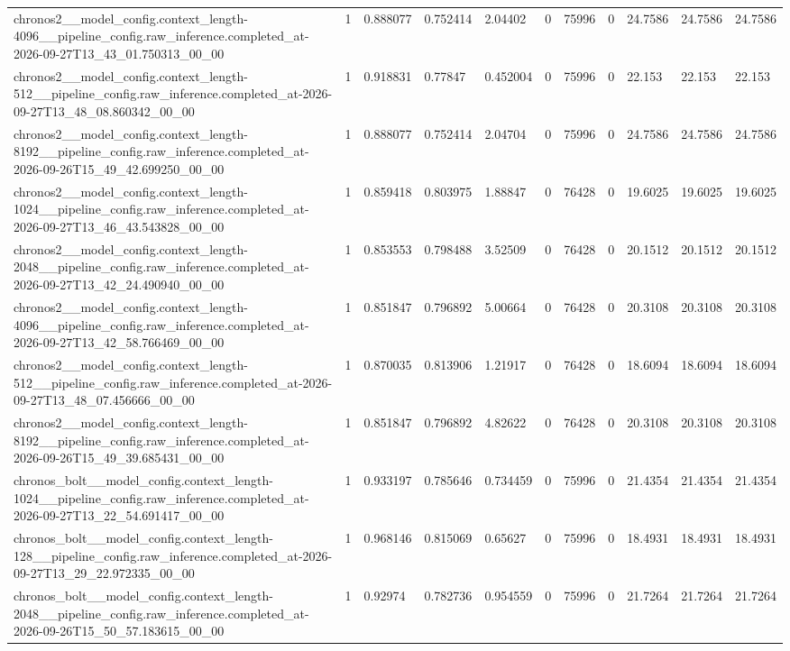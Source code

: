 \begin{tabular}{lllllllllll}
chronos2\_\_model\_config.context\_length-4096\_\_pipeline\_config.raw\_inference.completed\_at-2026-09-27T13\_43\_01.750313\_00\_00 & 1 & 0.888077 & 0.752414 & 2.04402 & 0 & 75996 & 0 & 24.7586 & 24.7586 & 24.7586 \\
chronos2\_\_model\_config.context\_length-512\_\_pipeline\_config.raw\_inference.completed\_at-2026-09-27T13\_48\_08.860342\_00\_00 & 1 & 0.918831 & 0.77847 & 0.452004 & 0 & 75996 & 0 & 22.153 & 22.153 & 22.153 \\
chronos2\_\_model\_config.context\_length-8192\_\_pipeline\_config.raw\_inference.completed\_at-2026-09-26T15\_49\_42.699250\_00\_00 & 1 & 0.888077 & 0.752414 & 2.04704 & 0 & 75996 & 0 & 24.7586 & 24.7586 & 24.7586 \\
chronos2\_\_model\_config.context\_length-1024\_\_pipeline\_config.raw\_inference.completed\_at-2026-09-27T13\_46\_43.543828\_00\_00 & 1 & 0.859418 & 0.803975 & 1.88847 & 0 & 76428 & 0 & 19.6025 & 19.6025 & 19.6025 \\
chronos2\_\_model\_config.context\_length-2048\_\_pipeline\_config.raw\_inference.completed\_at-2026-09-27T13\_42\_24.490940\_00\_00 & 1 & 0.853553 & 0.798488 & 3.52509 & 0 & 76428 & 0 & 20.1512 & 20.1512 & 20.1512 \\
chronos2\_\_model\_config.context\_length-4096\_\_pipeline\_config.raw\_inference.completed\_at-2026-09-27T13\_42\_58.766469\_00\_00 & 1 & 0.851847 & 0.796892 & 5.00664 & 0 & 76428 & 0 & 20.3108 & 20.3108 & 20.3108 \\
chronos2\_\_model\_config.context\_length-512\_\_pipeline\_config.raw\_inference.completed\_at-2026-09-27T13\_48\_07.456666\_00\_00 & 1 & 0.870035 & 0.813906 & 1.21917 & 0 & 76428 & 0 & 18.6094 & 18.6094 & 18.6094 \\
chronos2\_\_model\_config.context\_length-8192\_\_pipeline\_config.raw\_inference.completed\_at-2026-09-26T15\_49\_39.685431\_00\_00 & 1 & 0.851847 & 0.796892 & 4.82622 & 0 & 76428 & 0 & 20.3108 & 20.3108 & 20.3108 \\
chronos\_bolt\_\_model\_config.context\_length-1024\_\_pipeline\_config.raw\_inference.completed\_at-2026-09-27T13\_22\_54.691417\_00\_00 & 1 & 0.933197 & 0.785646 & 0.734459 & 0 & 75996 & 0 & 21.4354 & 21.4354 & 21.4354 \\
chronos\_bolt\_\_model\_config.context\_length-128\_\_pipeline\_config.raw\_inference.completed\_at-2026-09-27T13\_29\_22.972335\_00\_00 & 1 & 0.968146 & 0.815069 & 0.65627 & 0 & 75996 & 0 & 18.4931 & 18.4931 & 18.4931 \\
chronos\_bolt\_\_model\_config.context\_length-2048\_\_pipeline\_config.raw\_inference.completed\_at-2026-09-26T15\_50\_57.183615\_00\_00 & 1 & 0.92974 & 0.782736 & 0.954559 & 0 & 75996 & 0 & 21.7264 & 21.7264 & 21.7264 \\

\end{tabular}
